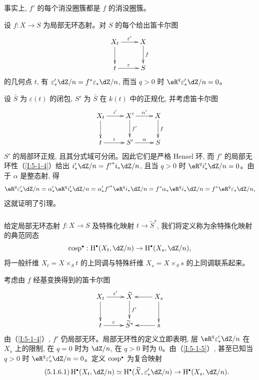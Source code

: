 事实上, $f'$ 的每个消没圈簇都是 $f$ 的消没圈簇。

\begin{lemma}\label{I:5-1-5}
设 $f:X\to S$ 为局部无环态射。对 $S$ 的每个给出笛卡尔图
\[\xymatrix{
  X_t \ar[r]^-{\varepsilon'} \ar[d]
    & X \ar[d]^-f \\
  t \ar[r]^-\varepsilon
    & S
}\]
的几何点 $t$, 有 $\varepsilon_*'\dZ/n=f^*\varepsilon_*\dZ/n$, 而当 $q>0$ 时 $\eR^q\varepsilon_*'\dZ/n=0$。
\end{lemma}

设 $\bar S$ 为 $\varepsilon(t)$ 的闭包, $S'$ 为 $\bar S$ 在 $k(t)$ 中的正规化, 并考虑笛卡尔图
\[\xymatrix{
  X_t \ar[r]^-{i'} \ar[d]
    & X' \ar[r]^-{\alpha'} \ar[d]^-{f'}
    & X \ar[d]^-f \\
  t \ar[r]^-i
    & S' \ar[r]^-\alpha
    & S
}\]
$S'$ 的局部环正规, 且其分式域可分闭。因此它们是严格 Hensel 环, 而 $f'$ 的局部无环性（\ref{I:5-1-4}）给出 $i'_*\dZ/n={f'}^*i_*\dZ/n$, 且当 $q>0$ 时 $\eR^q i'_*\dZ/n=0$。由于 $\alpha$ 是整态射, 得
\[
  \eR^q\varepsilon_*'\dZ/n
    = \alpha_*' \eR^q i_*' \dZ/n
    = \alpha_*' {f'}^* \eR^q i_* \dZ/n
    = f^* \alpha_* \eR^q i_* \dZ/n
    = f^* \eR^q \varepsilon_* \dZ/n \text{,}
\]
这就证明了引理。

\subsubsection{}\label{I:5-1-6}

给定局部无环态射 $f:X\to S$ 及特殊化映射 $t\to\widetilde S^s$, 我们将定义称为余特殊化映射的典范同态
\[
  \cosp^\bullet : \h^\bullet(X_t,\dZ/n) \to \h^\bullet(X_s,\dZ/n)\text{,}
\]
将一般纤维 $X_t=X\times_St$ 的上同调与特殊纤维 $X_s=X\times_Ss$ 的上同调联系起来。

考虑由 $f$ 经基变换得到的笛卡尔图
\[\xymatrix{
  X_t \ar[d] \ar[r]^-{\varepsilon'}
    & \widetilde X \ar[d]^-{f'}
    & \ar[l] X_s \ar[d] \\
  t \ar[r]^-\varepsilon
    & \widetilde S^s
    & \ar[l] s
}\]
由（\ref{I:5-1-4}）, $f'$ 仍局部无环。局部无环性的定义立即表明, 层 $\eR^q\varepsilon_*'\dZ/n$ 在 $X_s$ 上的限制, 在 $q=0$ 时为 $\dZ/n$, 在 $q>0$ 时为 $0$。由（\ref{I:5-1-5}）, 甚至已知当 $q>0$ 时 $\eR^q\varepsilon_*'\dZ/n=0$。定义 $\cosp^\bullet$ 为复合映射
\begin{equation*}\tag{5.1.6.1}\label{I:eq:5-1-6-1}
  \h^\bullet(X_t,\dZ/n) \simeq \h^\bullet(\widetilde X,\varepsilon_*' \dZ/n) \to \h^\bullet(X_s,\dZ/n) \text{.}
\end{equation*}

